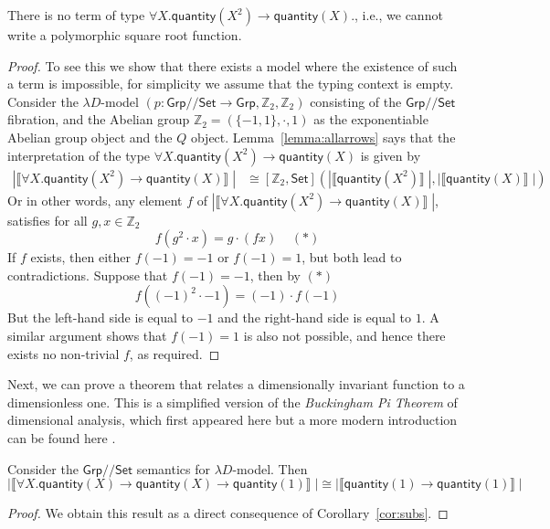 \documentclass[a4paper,UKenglish]{lipics}
\newcommand{\msf}[1]{\mathsf{#1}} %
\newcommand{\Grp}{\msf{Grp}}
\newcommand{\Set}{\msf{Set}}
\newcommand{\GroupSet}[1]{[#1,\Set]}
\newcommand{\Lslice}[1]{#1/\!/\Set}
\newcommand{\GrpSet}{\Lslice{\Grp}}
\newcommand{\bbZ}{\mathbb{Z}}
\newcommand{\sem}[1]{\ensuremath{\llbracket #1 \rrbracket} \;}
\newcommand{\qnt}{\msf{quantity}}
\begin{document}
\begin{theorem}
\label{thm:UninhabType}
 There is no term of type $\forall X . \qnt(X^2) \rightarrow \qnt(X)$., i.e., we cannot write a polymorphic square root function.
\end{theorem}
\begin{proof}
To see this we show that there exists a model where the existence of such a term is impossible, for simplicity we assume that the typing context is empty. Consider the $\lambda D$-model $(p:\GrpSet \rightarrow \Grp, \mathbb{Z}_2, \mathbb{Z}_2)$  consisting of the $\GrpSet$ fibration, and the Abelian group $\mathbb{Z}_2 = (\{ -1, 1\},\cdot,1)$ as the exponentiable Abelian group object and the $Q$ object. Lemma~\ref{lemma:allarrows} says that the interpretation of the type $\forall X . \qnt(X^2) \rightarrow \qnt(X)$ is given by
\begin{align*}
  |\sem{\forall X . \qnt(X^2) \rightarrow \qnt(X)}|  &  \cong \GroupSet{\mathbb{Z}_2} (|\sem{\qnt (X^2)}|, |\sem{\qnt(X)}|)
\end{align*}
Or in other words, any element $f$ of $ |\sem{\forall X . \qnt(X^2) \rightarrow \qnt(X)}|$, satisfies for all $g, x \in \bbZ_2$
\[
f (g^2 \cdot x) = g \cdot (fx) \; \; \; \; (\ast)
\]
If $f$ exists, then either $f(-1) = -1$ or $f(-1) = 1$, but both lead to contradictions. Suppose that $f(-1) = -1$, then by $(\ast)$
\[
 f((-1)^2 \cdot -1) = (-1) \cdot f(-1)
\]
But the left-hand side is equal to $-1$ and the right-hand side is equal to $1$. A similar argument shows that $f(-1)=1$ is also not possible, and hence there exists no non-trivial $f$, as required.
\end{proof}

Next, we can prove a theorem that relates a dimensionally invariant function to a dimensionless one. This is a simplified version of the \emph{Buckingham Pi Theorem} of dimensional analysis, which first appeared here \cite{buckingham1914physically} but a more modern introduction can be found here \cite{sonin2001physical}.

\begin{theorem}
 \label{lem:AppSubs}
Consider the $\GrpSet$ semantics for $\lambda D$-model. Then
\[
 |\sem{\forall X . \qnt(X) \rightarrow \qnt(X) \rightarrow \qnt(1)}| \cong |\sem{\qnt(1)\rightarrow \qnt(1)}|
\]
\end{theorem}
\begin{proof}
We obtain this result as a direct consequence of Corollary~\ref{cor:subs}.
\end{proof}
\end{document}
